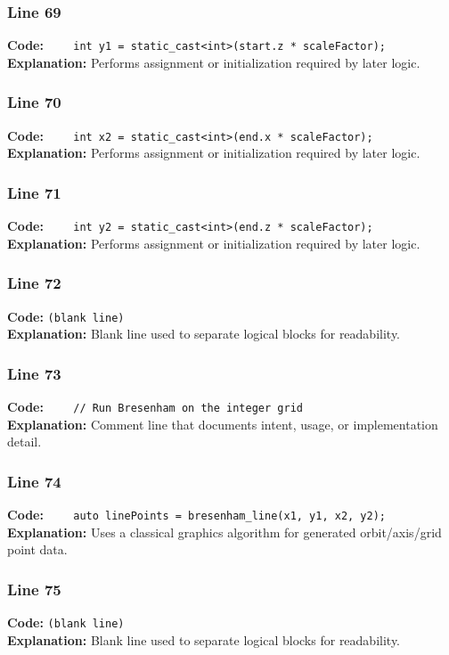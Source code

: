 \documentclass[11pt,a4paper]{article}
\begin{document}
\subsubsection*{Line 69}
\textbf{Code:} \verb|    int y1 = static_cast<int>(start.z * scaleFactor);|\\
\textbf{Explanation:} Performs assignment or initialization required by later logic.

\subsubsection*{Line 70}
\textbf{Code:} \verb|    int x2 = static_cast<int>(end.x * scaleFactor);|\\
\textbf{Explanation:} Performs assignment or initialization required by later logic.

\subsubsection*{Line 71}
\textbf{Code:} \verb|    int y2 = static_cast<int>(end.z * scaleFactor);|\\
\textbf{Explanation:} Performs assignment or initialization required by later logic.

\subsubsection*{Line 72}
\textbf{Code:} \texttt{(blank line)}\\
\textbf{Explanation:} Blank line used to separate logical blocks for readability.

\subsubsection*{Line 73}
\textbf{Code:} \verb|    // Run Bresenham on the integer grid|\\
\textbf{Explanation:} Comment line that documents intent, usage, or implementation detail.

\subsubsection*{Line 74}
\textbf{Code:} \verb|    auto linePoints = bresenham_line(x1, y1, x2, y2);|\\
\textbf{Explanation:} Uses a classical graphics algorithm for generated orbit/axis/grid point data.

\subsubsection*{Line 75}
\textbf{Code:} \texttt{(blank line)}\\
\textbf{Explanation:} Blank line used to separate logical blocks for readability.
\end{document}
